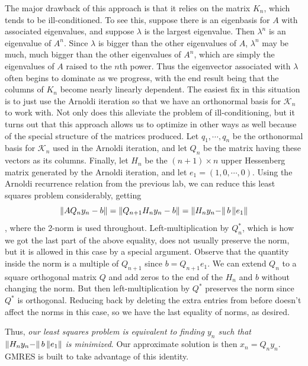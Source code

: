 The major drawback of this approach is that it relies on the matrix $K_n$, which tends to be ill-conditioned.
To see this, suppose there is an eigenbasis for $A$ with associated eigenvalues, and suppose $\lambda$ is the largest eigenvalue.
Then $\lambda^n$ is an eigenvalue of $A^n$.
Since $\lambda$ is bigger than the other eigenvalues of $A$, $\lambda^n$ may be much, much bigger than the other eigenvalues of $A^n$, which are simply the eigenvalues of $A$ raised to the $n$th power.
Thus the eigenvector associated with $\lambda$ often begins to dominate as we progress, with the end result being that the columns of $K_n$ become nearly linearly dependent.
The easiest fix in this situation is to just use the Arnoldi iteration so that we have an orthonormal basis for $\mathcal{K}_n$ to work with.
Not only does this alleviate the problem of ill-conditioning, but it turns out that this approach allows us to optimize in other ways as well because of the special structure of the matrices produced.
Let $q_1,\cdots, q_n$ be the orthonormal basis for $\mathcal{K}_n$ used in the Arnoldi iteration, and let $Q_n$ be the matrix having these vectors as its columns.
Finally, let $H_n$ be the $(n+1)\times n$ upper Hessenberg matrix generated by the Arnoldi iteration, and let $e_1=(1,0,\cdots,0)$.
Using the Arnoldi recurrence relation from the previous lab, we can reduce this least squares problem considerably, getting
\[\left\lVert AQ_n y_n-b\right\rVert=\left\lVert Q_{n+1}H_{n}y_n-b\right\rVert=\left\lVert H_ny_n-\right\rVert b \left\lVert e_1\right\rVert\],
where the 2-norm is used throughout.
Left-multiplication by $Q_{n}^{*}$, which is how we got the last part of the above equality, does not usually preserve the norm, but it is allowed in this case by a special argument.
Observe that the quantity inside the norm is a multiple of $Q_{n+1}$ since $b=Q_{n+1}e_1$.
We can extend $Q_n$ to a square orthogonal matrix $Q$ and add zeros to the end of the $H_n$ and $b$ without changing the norm.
But then left-multiplication by $Q^*$ preserves the norm since $Q^*$ is orthogonal.
Reducing back by deleting the extra entries from before doesn't affect the norms in this case, so we have the last equality of norms, as desired.

Thus, \emph{our least squares problem is equivalent to finding $y_n$ such that $\left\lVert H_ny_n-\right\rVert b \left\lVert e_1\right\rVert$ is minimized}.
Our approximate solution is then $x_n=Q_n y_n$. GMRES is built to take advantage of this identity.

